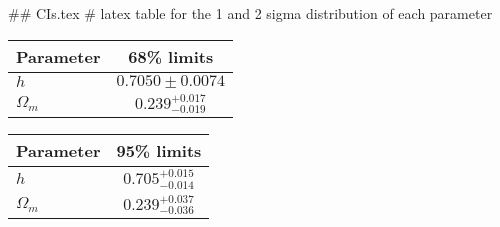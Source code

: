## CIs.tex
# latex table for the 1 and 2 sigma distribution of each parameter

\begin{tabular} { l  c}
 Parameter &  68\% limits\\
\hline
{\boldmath$h              $} & $0.7050\pm 0.0074          $\\
{\boldmath$\Omega_m       $} & $0.239^{+0.017}_{-0.019}   $\\
\hline
\end{tabular}

\begin{tabular} { l  c}
 Parameter &  95\% limits\\
\hline
{\boldmath$h              $} & $0.705^{+0.015}_{-0.014}   $\\
{\boldmath$\Omega_m       $} & $0.239^{+0.037}_{-0.036}   $\\
\hline
\end{tabular}
